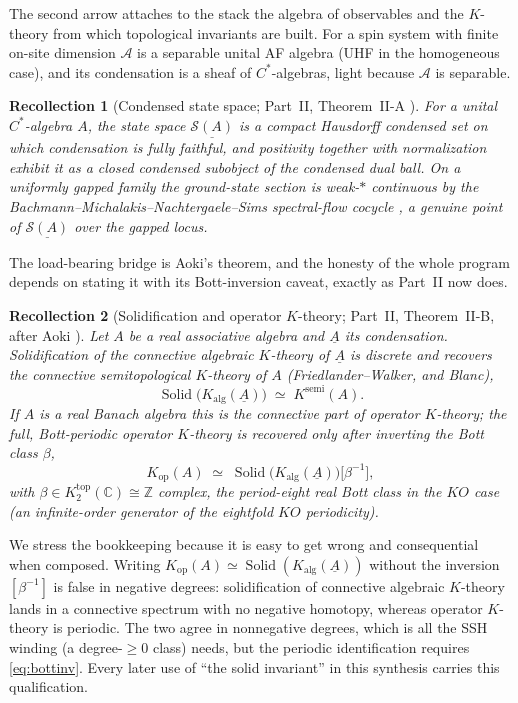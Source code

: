 \documentclass[12pt]{article}
\newcommand{\cond}[1]{\underline{#1}}          %
\newcommand{\Kop}{K_{\mathrm{op}}}             %
\newcommand{\Kalg}{K_{\mathrm{alg}}}           %
\newcommand{\Solid}{\operatorname{Solid}}      %
\newcommand{\CC}{\mathbb{C}}
\newcommand{\ZZ}{\mathbb{Z}}
\newcommand{\qA}{\mathcal{A}}                  %
\newcommand{\St}{\mathcal{S}}                  %
\theoremstyle{plain}
\newtheorem{recollection}[recollection]{Recollection}
\theoremstyle{definition}
\theoremstyle{remark}
\begin{document}
The second arrow attaches to the stack the algebra of observables and the $K$-theory
from which topological invariants are built. For a spin system with finite on-site
dimension $\qA$ is a separable unital AF algebra (UHF in the homogeneous case), and its
condensation is a sheaf of $C^\ast$-algebras, light because $\qA$ is separable.

\begin{recollection}[Condensed state space; Part~II, Theorem~II-A \cite{paperPositivity}]
\label{rec:IIa}
For a unital $C^\ast$-algebra $A$, the state space $\cond{\St(A)}$ is a compact
Hausdorff condensed set on which condensation is fully faithful, and positivity together
with normalization exhibit it as a closed condensed subobject of the condensed dual
ball. On a uniformly gapped family the ground-state section is weak-$\ast$ continuous by
the Bachmann--Michalakis--Nachtergaele--Sims spectral-flow cocycle
\cite{bmns-automorphic}, a genuine point of $\cond{\St(A)}$ over the gapped locus.
\end{recollection}

The load-bearing bridge is Aoki's theorem, and the honesty of the whole program depends
on stating it with its Bott-inversion caveat, exactly as Part~II now does.

\begin{recollection}[Solidification and operator $K$-theory; Part~II, Theorem~II-B, after Aoki \cite{aoki-solidification,paperPositivity}]
\label{rec:aoki}
Let $A$ be a real associative algebra and $\cond{A}$ its condensation. Solidification of
the \emph{connective} algebraic $K$-theory of $\cond{A}$ is discrete and recovers the
connective semitopological $K$-theory of $A$ (Friedlander--Walker, and Blanc),
\[
\Solid\bigl(\Kalg(\cond{A})\bigr)\;\simeq\;K^{\mathrm{semi}}(A).
\]
If $A$ is a real Banach algebra this is the connective part of operator $K$-theory; the
full, Bott-periodic operator $K$-theory is recovered only after inverting the Bott class
$\beta$,
\begin{equation}
\label{eq:bottinv}
\Kop(A)\;\simeq\;\Solid\bigl(\Kalg(\cond{A})\bigr)\bigl[\beta^{-1}\bigr],
\end{equation}
with $\beta\in K_2^{\mathrm{top}}(\CC)\cong\ZZ$ complex, the period-eight real Bott class
in the $KO$ case (an infinite-order generator of the eightfold $KO$ periodicity).
\end{recollection}

We stress the bookkeeping because it is easy to get wrong and consequential when
composed. Writing $\Kop(A)\simeq\Solid(\Kalg(\cond{A}))$ without the inversion
$[\beta^{-1}]$ is false in negative degrees: solidification of connective algebraic
$K$-theory lands in a connective spectrum with no negative homotopy, whereas operator
$K$-theory is periodic. The two agree in nonnegative degrees, which is all the SSH
winding (a degree-$\ge 0$ class) needs, but the periodic identification requires
\eqref{eq:bottinv}. Every later use of ``the solid invariant'' in this synthesis carries
this qualification.
\end{document}
